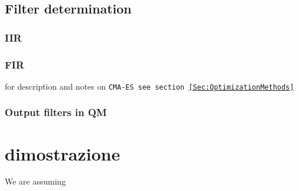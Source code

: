 \begin{comment}
    TO DO LIST:
    * calcoli analitici di convoluzioni per dimostrare che è giusto il modo in cui combiniamo i filtri
    * eventualmente provare ad aggiungere più correzioni esponenziali
\end{comment}
\subsection{Filter determination}
\subsubsection{IIR}
\subsubsection{FIR}
for description and notes on \tt{CMA-ES} see section \ref{Sec:OptimizationMethods}
\subsubsection{Output filters in QM}

\section{dimostrazione}

We are assuming

\begin{equation}
    
\end{equation}